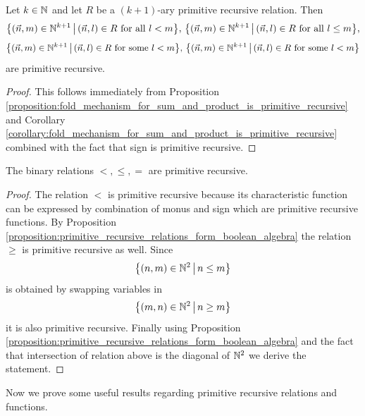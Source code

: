 \documentclass[10pt]{amsart}
\begin{document}
\begin{proposition}\label{proposition:bounded_quantifiers_are_primitive_recursive}
	Let $k\in {\mathbb N}$ and let $R$ be a $(k + 1)$-ary primitive recursive relation. Then
	$$\big\{(\vec{n},m) \in {\mathbb N}^{k+1}\,\big|\,(\vec{n},l)\in R\mbox{ for all }l < m\big\},\,\big\{(\vec{n},m) \in {\mathbb N}^{k+1}\,\big|\,(\vec{n},l)\in R\mbox{ for all }l \leq m\big\},$$
	$$\big\{(\vec{n},m) \in {\mathbb N}^{k+1}\,\big|\,(\vec{n},l)\in R\mbox{ for some }l < m\big\},\,\big\{(\vec{n},m) \in {\mathbb N}^{k+1}\,\big|\,(\vec{n},l)\in R\mbox{ for some }l < m\big\}$$
	are primitive recursive.
\end{proposition}
\begin{proof}
	This follows immediately from Proposition \ref{proposition:fold_mechanism_for_sum_and_product_is_primitive_recursive} and Corollary \ref{corollary:fold_mechanism_for_sum_and_product_is_primitive_recursive} combined with the fact that sign is primitive recursive.
\end{proof}

\begin{proposition}\label{proposition:order_relations_are_primitive_recursive}
	The binary relations $<,\leq,=$ are primitive recursive.
\end{proposition}
\begin{proof}
	The relation $<$ is primitive recursive  because its characteristic function can be expressed by combination of monus and sign which are primitive recursive functions. By Proposition \ref{proposition:primitive_recursive_relations_form_boolean_algebra} the relation $\geq$  is primitive recursive  as well. Since
	$$\big\{(n,m) \in {\mathbb N}^2\,\big|\,n \leq m\big\}$$
	is obtained  by swapping variables in
	$$\big\{(m,n) \in {\mathbb N}^2\,\big|\,n\geq m \big\}$$
	it is also primitive recursive. Finally using Proposition \ref{proposition:primitive_recursive_relations_form_boolean_algebra} and the fact that intersection of relation above is the diagonal of ${\mathbb N}^2$ we derive the statement.
\end{proof}
\noindent
Now we prove some useful results regarding primitive recursive relations and functions.
\end{document}
